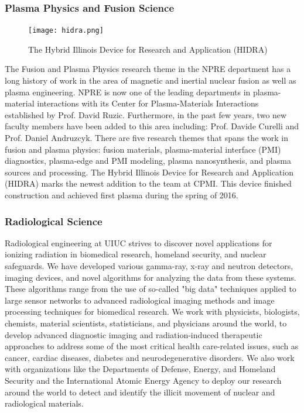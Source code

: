 \subsubsection{Plasma Physics and Fusion Science}
\begin{figure}
  \begin{center}
  \vspace{-\baselineskip}
    \texttt{[image: hidra.png]}
    \caption{The Hybrid Illinois Device for Research and Application (HIDRA)}
  \end{center}
\end{figure}
The Fusion and Plasma Physics research theme in the NPRE department has a long history of work in the area of magnetic and inertial nuclear fusion as well as plasma engineering. NPRE is now one of the leading departments in plasma-material interactions with its Center for Plasma-Materials Interactions established by Prof. David Ruzic. Furthermore, in the past few years, two new faculty members have been added to this area including: Prof. Davide Curelli and Prof. Daniel Andruzcyk. There are five research themes that spans the work in fusion and plasma physics: fusion materials, plasma-material interface (PMI) diagnostics, plasma-edge and PMI modeling, plasma nanosynthesis, and plasma sources and processing. The Hybrid Illinois Device for Research and Application (HIDRA) marks the newest addition to the team at CPMI. This device finished construction and achieved first plasma during the spring of 2016. \\

\subsubsection{Radiological Science}
Radiological engineering at UIUC strives to discover novel applications for ionizing radiation in biomedical research, homeland security, and nuclear safeguards. We have developed various gamma-ray, x-ray and neutron detectors, imaging devices, and novel algorithms for analyzing the data from these systems. These algorithms range from the use of so-called "big data" techniques applied to large sensor networks to advanced radiological imaging methods and image processing techniques for biomedical research. We work with physicists, biologists, chemists, material scientists, statisticians, and physicians around the world, to develop advanced diagnostic imaging and radiation-induced therapeutic approaches to address some of the most critical health care-related issues, such as cancer, cardiac diseases, diabetes and neurodegenerative disorders. We also work with organizations like the Departments of Defense, Energy, and Homeland Security and the International Atomic Energy Agency to deploy our research around the world to detect and identify the illicit movement of nuclear and radiological materials.

